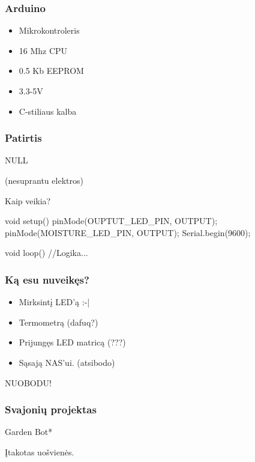 \documentclass[12pt,a4paper]{beamer}
\begin{document}
\begin{frame}
    \frametitle{Arduino}

    \begin{itemize}
        \item Mikrokontroleris
        \item 16 Mhz CPU
        \item 0.5 Kb EEPROM
        \item 3.3-5V
        \item C-stiliaus kalba
    \end{itemize}
    
\end{frame}

\begin{frame}
    \frametitle{Patirtis}
	\begin{center}
        {\Huge NULL}
	\end{center}
    \begin{center}
        (nesuprantu elektros)
    \end{center}
\end{frame}


\begin{frame}[fragile]{Kaip veikia?}
\begin{ccode}
    void setup() {                
        pinMode(OUPTUT_LED_PIN, OUTPUT);
        pinMode(MOISTURE_LED_PIN, OUTPUT);
        Serial.begin(9600);
    }

    void loop() {
        //Logika...
    }
\end{ccode}
\end{frame}

\begin{frame}
    \frametitle{Ką esu nuveikęs?}

    \pause
    \begin{itemize}
        \item Mirksintį LED'ą :-|
        \pause
        \item Termometrą (dafuq?)
        \pause
        \item Prijungęs LED matricą (???)
        \pause
        \item Sąsają NAS'ui. (atsibodo)
    \end{itemize}
    \pause
    \begin{center}
        NUOBODU!
    \end{center}
\end{frame}

\begin{frame}
    \frametitle{Svajonių projektas}

    \begin{center}
        {\Huge Garden Bot*}
    \end{center}

    \vskip1cm
    {\small *Įtakotas uošvienės.}
    
\end{frame}
\end{document}
